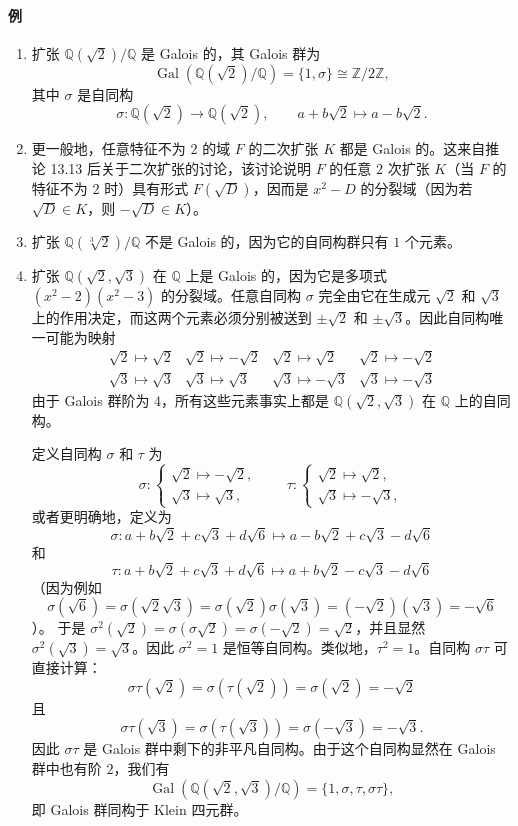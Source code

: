 \paragraph{例}
\begin{enumerate}[label=(\arabic*)]
\item 扩张 $\mathbb Q(\sqrt2)/\mathbb Q$ 是 Galois 的，其 Galois 群为
\[
\operatorname{Gal}(\mathbb Q(\sqrt2)/\mathbb Q)=\{1,\sigma\}\cong \mathbb Z/2\mathbb Z,
\]
其中 $\sigma$ 是自同构
\[
\sigma: \mathbb Q(\sqrt2)\longrightarrow \mathbb Q(\sqrt2),\qquad
 a+b\sqrt2\longmapsto a-b\sqrt2.
\]

\item 更一般地，任意特征不为 $2$ 的域 $F$ 的二次扩张 $K$ 都是 Galois 的。这来自推论 13.13 后关于二次扩张的讨论，该讨论说明 $F$ 的任意 $2$ 次扩张 $K$（当 $F$ 的特征不为 $2$ 时）具有形式 $F(\sqrt D)$，因而是 $x^2-D$ 的分裂域（因为若 $\sqrt D\in K$，则 $-\sqrt D\in K$）。

\item 扩张 $\mathbb Q(\sqrt[3]{2})/\mathbb Q$ 不是 Galois 的，因为它的自同构群只有 $1$ 个元素。

\item 扩张 $\mathbb Q(\sqrt2,\sqrt3)$ 在 $\mathbb Q$ 上是 Galois 的，因为它是多项式 $(x^2-2)(x^2-3)$ 的分裂域。任意自同构 $\sigma$ 完全由它在生成元 $\sqrt2$ 和 $\sqrt3$ 上的作用决定，而这两个元素必须分别被送到 $\pm\sqrt2$ 和 $\pm\sqrt3$。因此自同构唯一可能为映射
\[
\begin{array}{c|c|c|c}
\sqrt2\mapsto\sqrt2 & \sqrt2\mapsto-\sqrt2 & \sqrt2\mapsto\sqrt2 & \sqrt2\mapsto-\sqrt2\\
\sqrt3\mapsto\sqrt3 & \sqrt3\mapsto\sqrt3 & \sqrt3\mapsto-\sqrt3 & \sqrt3\mapsto-\sqrt3
\end{array}
\]
由于 Galois 群阶为 $4$，所有这些元素事实上都是 $\mathbb Q(\sqrt2,\sqrt3)$ 在 $\mathbb Q$ 上的自同构。

定义自同构 $\sigma$ 和 $\tau$ 为
\[
\sigma:\left\{
\begin{array}{l}
\sqrt2\mapsto-\sqrt2,\\
\sqrt3\mapsto\sqrt3,
\end{array}\right.
\qquad
\tau:\left\{
\begin{array}{l}
\sqrt2\mapsto\sqrt2,\\
\sqrt3\mapsto-\sqrt3,
\end{array}\right.
\]
或者更明确地，定义为
\[
\sigma: a+b\sqrt2+c\sqrt3+d\sqrt6\longmapsto a-b\sqrt2+c\sqrt3-d\sqrt6
\]
和
\[
\tau: a+b\sqrt2+c\sqrt3+d\sqrt6\longmapsto a+b\sqrt2-c\sqrt3-d\sqrt6
\]
（因为例如
\[
\sigma(\sqrt6)=\sigma(\sqrt2\sqrt3)=\sigma(\sqrt2)\sigma(\sqrt3)=(-\sqrt2)(\sqrt3)=-\sqrt6
\]
）。
于是 $\sigma^2(\sqrt2)=\sigma(\sigma\sqrt2)=\sigma(-\sqrt2)=\sqrt2$，并且显然 $\sigma^2(\sqrt3)=\sqrt3$。因此 $\sigma^2=1$ 是恒等自同构。类似地，$\tau^2=1$。自同构 $\sigma\tau$ 可直接计算：
\[
\sigma\tau(\sqrt2)=\sigma(\tau(\sqrt2))=\sigma(\sqrt2)=-\sqrt2
\]
且
\[
\sigma\tau(\sqrt3)=\sigma(\tau(\sqrt3))=\sigma(-\sqrt3)=-\sqrt3.
\]
因此 $\sigma\tau$ 是 Galois 群中剩下的非平凡自同构。由于这个自同构显然在 Galois 群中也有阶 $2$，我们有
\[
\operatorname{Gal}(\mathbb Q(\sqrt2,\sqrt3)/\mathbb Q)=\{1,\sigma,\tau,\sigma\tau\},
\]
即 Galois 群同构于 Klein 四元群。


\end{enumerate}
